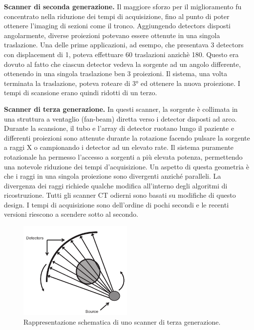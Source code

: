 \documentclass[a4paper,11pt, oneside]{article}
\begin{document}
                    \bigskip
                    \par
                        \textbf{Scanner di seconda generazione.} Il maggiore sforzo per il miglioramento fu concentrato nella riduzione dei tempi di acquisizione, fino al punto di poter ottenere l’imaging di sezioni come il tronco. Aggiungendo detectors disposti angolarmente, diverse proiezioni potevano essere ottenute in una singola traslazione. Una delle prime applicazioni, ad esempo, che presentava 3 detectors con displacement di 1\degree, poteva effettuare 60 traslazioni anzichè 180. Questo era dovuto al fatto che ciascun detector vedeva la sorgente ad un angolo differente, ottenendo in una singola traslazione ben 3 proiezioni. Il sistema, una volta terminata la traslazione, poteva roteare di 3° ed ottenere la nuova proiezione. I tempi di scansione erano quindi ridotti di un terzo. 
                    
                    \bigskip
                    \par
                        \textbf{Scanner di terza generazione.} In questi scanner, la sorgente è collimata in una struttura a ventaglio (fan-beam) diretta verso i detector disposti ad arco. Durante la scansione, il tubo e l’array di detector ruotano lungo il paziente e differenti proiezioni sono attenute durante la rotazione facendo pulsare la sorgente a raggi X o campionando i detector ad un elevato rate. Il sistema puramente rotazionale ha permesso l’accesso a sorgenti a più elevata potenza, permettendo una notevole riduzione dei tempi d’acquisizione. Un aspetto di questa geometria è che i raggi in una singola proiezione sono divergenti anziché paralleli. La divergenza dei raggi richiede qualche modifica all’interno degli algoritmi di ricostruzione. Tutti gli scanner CT odierni sono basati su modifiche di questo design. I tempi di acquisizione sono dell’ordine di pochi secondi e le recenti versioni riescono a scendere sotto al secondo.
                        
                        \begin{figure}[h]
                            \centering
                            \includegraphics[width=0.5\textwidth]{third-generation}
                            \caption{Rappresentazione schematica di uno scanner di terza generazione.}
                            \label{fig:third-generation}
                        \end{figure}
\end{document}

